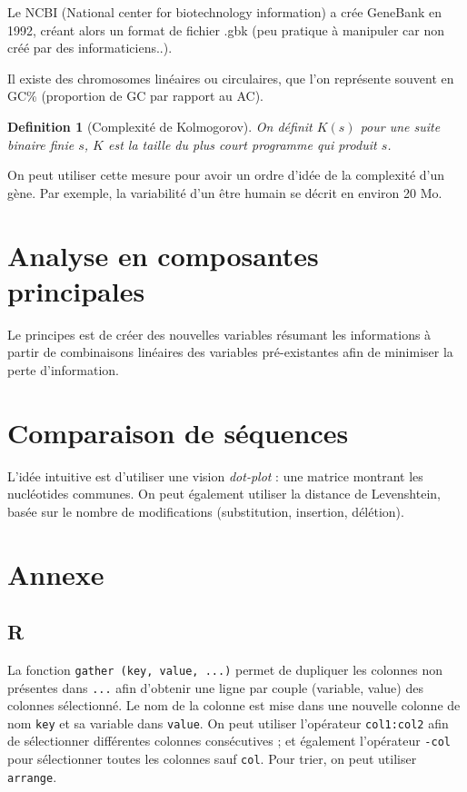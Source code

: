 \documentclass{article}
\newtheorem{defi}{Definition}
\begin{document}
Le NCBI (National center for biotechnology information) a crée GeneBank en 1992, créant alors un format de fichier .gbk (peu pratique à manipuler car non créé par des informaticiens..).

Il existe des chromosomes linéaires ou circulaires, que l'on représente souvent en GC\% (proportion de GC par rapport au AC).


\begin{defi}[Complexité de Kolmogorov]
On définit $K(s)$ pour une suite binaire finie $s$, $K$ est la taille du plus court programme qui produit $s$.
\end{defi}

On peut utiliser cette mesure pour avoir un ordre d'idée de la complexité d'un gène. Par exemple, la variabilité d'un être humain  se décrit en environ 20 Mo.







\section{Analyse en composantes principales}
Le principes est de créer des nouvelles variables résumant les informations à partir de combinaisons linéaires des variables pré-existantes afin de minimiser la perte d'information.


\section{Comparaison de séquences}
L'idée intuitive est d'utiliser une vision \emph{dot-plot} : une matrice montrant les nucléotides communes. On peut également utiliser la distance de Levenshtein, basée sur le nombre de modifications (substitution, insertion, délétion).






\section{Annexe}
\subsection{R}
La fonction \texttt{gather (key, value, ...)} permet de dupliquer les colonnes non présentes dans \texttt{...} afin d'obtenir une ligne par couple (variable, value) des colonnes sélectionné. Le nom de la colonne est mise dans une nouvelle colonne de nom \texttt{key} et sa variable dans \texttt{value}. On peut utiliser l'opérateur \texttt{col1:col2} afin de sélectionner différentes colonnes consécutives ; et également l'opérateur \texttt{-col} pour sélectionner toutes les colonnes sauf \texttt{col}. Pour trier, on peut utiliser \texttt{arrange}.
\end{document}
